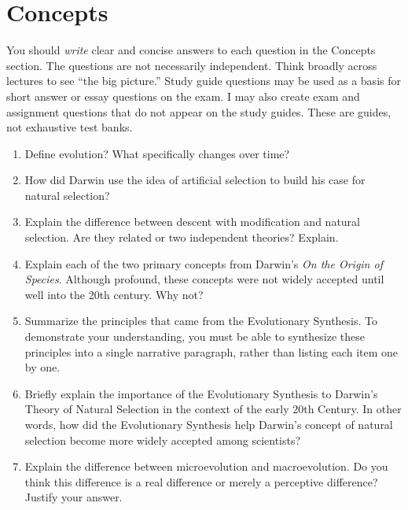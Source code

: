 \documentclass[letterpaper]{tufte-handout}
\begin{document}
\section{Concepts}

You should \emph{write} clear and concise answers to each question in the Concepts section.  The questions are not necessarily independent.  Think broadly across lectures to see ``the big picture.''  Study guide questions may be used as a basis for short answer or essay questions on the exam. I may also create exam and assignment questions that do not appear on the study guides. These are guides, not exhaustive test banks.

\begin{enumerate}
	\item Define evolution?  What specifically changes over time?

	\item How did Darwin use the idea of artificial selection to build his case for natural selection?  

	\item Explain the difference between descent with modification and natural selection.  Are they related or two independent theories?  Explain.

	\item Explain each of the two primary concepts from Darwin's \emph{On the Origin of Species}.  Although profound, these concepts were not widely accepted until well into the 20th century.  Why not?

	\item Summarize the principles that came from the Evolutionary Synthesis. To demonstrate your understanding, you must be able to synthesize these principles into a single narrative paragraph, rather than listing each item one by one.  

	\item Briefly explain the importance of the Evolutionary Synthesis to Darwin's Theory of Natural Selection in the context of the early 20th Century.  In other words, how did the Evolutionary Synthesis help Darwin's concept of natural selection become more widely accepted among scientists?

	\item Explain the difference between microevolution and macroevolution.  Do you think this difference is a real difference or merely a perceptive difference?  Justify your answer. 

\end{enumerate}
\end{document}

